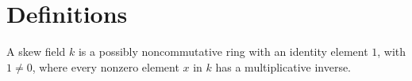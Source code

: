 \section{Definitions}

\begin{definition}
	\label{definition-skew-field}
    A skew field $k$ is a possibly noncommutative ring with an identity element $1$, with $1 \neq 0$, where every nonzero element $x$ in $k$ has a multiplicative inverse.
\end{definition}